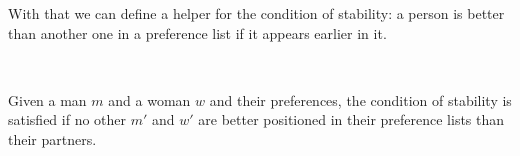 {With that we can define a helper for the condition of stability: a person is better than another one in a preference list if it appears earlier in it.

\begin{code}%
\>[0]\AgdaSpace{}%
\AgdaSymbol{:}\AgdaSpace{}%
\AgdaSpace{}%
\AgdaSpace{}%
\AgdaSpace{}%
\AgdaSpace{}%
\AgdaSpace{}%
\AgdaSpace{}%
\AgdaSpace{}%
\<%
\\
\>[0]\AgdaSpace{}%
\AgdaOperator{\AgdaFunction{≻[}}\AgdaSpace{}%
\AgdaSpace{}%
\AgdaOperator{\AgdaFunction{]}}\AgdaSpace{}%
\AgdaSpace{}%
\AgdaSymbol{=}\AgdaSpace{}%
\AgdaSpace{}%
\AgdaSpace{}%
\AgdaSpace{}%
\AgdaSpace{}%
\AgdaSpace{}%
\AgdaSpace{}%
\<%
\end{code}

Given a man $m$ and a woman $w$ and their preferences, the condition of stability is satisfied if no other $m\prime$ and $w\prime$ are better positioned in their preference lists than their partners.

}
